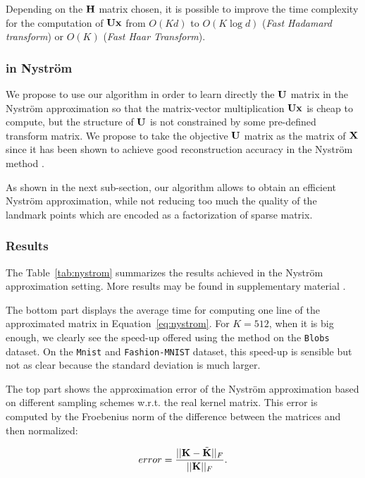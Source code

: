 Depending on the ${\mathbf{H}}$ matrix chosen, it is possible to improve the time complexity for the computation of ${\mathbf{U}}{\mathbf{x}}$ from $O(Kd)$ to $O(K \log{d})$ (\textit{Fast Hadamard transform}) or $O(K)$ (\textit{Fast Haar Transform}).

\subsubsection{\qkmeans in Nyström}

We propose to use our \qkmeans algorithm in order to learn directly the ${\mathbf{U}}$ matrix in the Nyström approximation so that the matrix-vector multiplication ${\mathbf{U}} {\mathbf{x}}$ is cheap to compute, but the structure of ${\mathbf{U}}$ is not constrained by some pre-defined transform matrix. We propose to take the objective ${\mathbf{U}}$ matrix as the \kmeans matrix of ${\mathbf{X}}$ since it has been shown to achieve good reconstruction accuracy in the Nyström method \cite{kumar2012sampling}.

As shown in the next sub-section, our algorithm allows to obtain an efficient Nyström approximation, while not reducing too much the quality of the \kmeans landmark points which are encoded as a factorization of sparse matrix. 

\subsubsection{Results}

The Table~\ref{tab:nystrom} summarizes the results achieved in the Nyström approximation setting. More results may be found in supplementary material . 

The bottom part displays the average time for computing one line of the approximated matrix in Equation~\ref{eq:nystrom}. For $K=512$, when it is big enough, we clearly see the speed-up offered using the \qkmeans method on the \texttt{Blobs} dataset. On the \texttt{Mnist} and \texttt{Fashion-MNIST} dataset, this speed-up is sensible but not as clear because the standard deviation is much larger. 

The top part shows the approximation error of the Nyström approximation based on different sampling schemes w.r.t. the real kernel matrix. This error is computed by the Froebenius norm of the difference between the matrices and then normalized:

\begin{equation}
 error = \frac{||{\mathbf{K}} - \tilde{{\mathbf{K}}}||_F}{||{\mathbf{K}}||_F}.
\end{equation}

